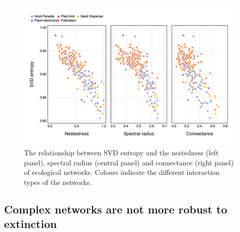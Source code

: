 \documentclass[11pt]{article}
\makeatletter
\def\maxwidth{\ifdim\Gin@nat@width>\linewidth\linewidth
\else\Gin@nat@width\fi}
\let\Oldincludegraphics\includegraphics
\renewcommand{\includegraphics}[1]{\Oldincludegraphics[width=\maxwidth]{#1}}
\makeatother
\begin{document}
\begin{figure}
\hypertarget{fig:other}{%
\centering
\includegraphics{figures/others_v_entropy.png}
\caption{The relationship between SVD entropy and the nestedness (left
panel), spectral radius (central panel) and connectance (right panel) of
ecological networks. Colours indicate the different interaction types of
the networks.}\label{fig:other}
}
\end{figure}

\hypertarget{complex-networks-are-not-more-robust-to-extinction}{%
\subsection{Complex networks are not more robust to
extinction}\label{complex-networks-are-not-more-robust-to-extinction}}
\end{document}
